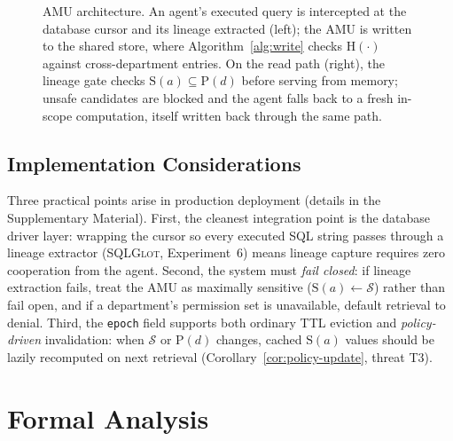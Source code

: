 \documentclass[nolineno]{ieeeaccess}
\begin{document}
\begin{figure}[t]
\caption{AMU architecture. An agent's executed query is intercepted at the
database cursor and its lineage extracted (left); the AMU is written to the
shared store, where Algorithm~\ref{alg:write} checks $\mathrm{H}(\cdot)$
against cross-department entries. On the read path (right), the lineage gate
checks $\mathrm{S}(a) \subseteq \mathrm{P}(d)$ before serving from memory;
unsafe candidates are blocked and the agent falls back to a fresh in-scope
computation, itself written back through the same path.}
\label{fig:arch}
\end{figure}

\subsection{Implementation Considerations}
\label{sec:implementation}

Three practical points arise in production deployment (details in the
Supplementary Material).
First, the cleanest integration point is the database driver layer: wrapping
the cursor so every executed SQL string passes through a lineage extractor
(\textsc{SQLGlot}, Experiment~6) means lineage capture requires zero
cooperation from the agent.
Second, the system must \emph{fail closed}: if lineage extraction fails,
treat the AMU as maximally sensitive ($\mathrm{S}(a) \leftarrow \mathcal{S}$)
rather than fail open, and if a department's permission set is unavailable,
default retrieval to denial.
Third, the \texttt{epoch} field supports both ordinary TTL eviction and
\emph{policy-driven} invalidation: when $\mathcal{S}$ or $\mathrm{P}(d)$
changes, cached $\mathrm{S}(a)$ values should be lazily recomputed on next
retrieval (Corollary~\ref{cor:policy-update}, threat T3).

\section{Formal Analysis}
\label{sec:formal}
\end{document}
